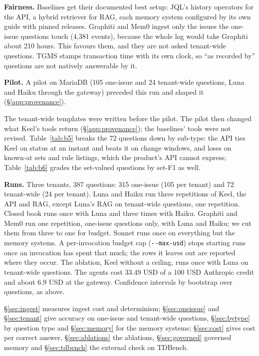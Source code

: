 \documentclass[sigconf, nonacm]{acmart}
\newcommand{\code}[1]{\texttt{#1}}
\begin{document}
\textbf{Fairness.} Baselines get their documented best setup: JQL's history operators for the API, a hybrid retriever for RAG, each memory system configured by its own guide with pinned releases. Graphiti and Mem0 ingest only the issues the one-issue questions touch (4,381 events), because the whole log would take Graphiti about 210 hours. This favours them, and they are not asked tenant-wide questions. TGMS stamps transaction time with its own clock, so ``as recorded by'' questions are not natively answerable by it.

\textbf{Pilot.} A pilot on MariaDB (105 one-issue and 24 tenant-wide questions, Luna and Haiku through the gateway) preceded this run and shaped it (\S\ref{app:provenance}).

The tenant-wide templates were written before the pilot. The pilot then changed what Keel's tools return (\S\ref{app:provenance}); the baselines' tools were not revised. Table~\ref{tab:b5} breaks the 72 questions down by sub-type: the API ties Keel on status at an instant and beats it on change windows, and loses on known-at sets and rule listings, which the product's API cannot express; Table~\ref{tab:b6} grades the set-valued questions by set-F1 as well.

\textbf{Runs.} Three tenants, 387 questions: 315 one-issue (105 per tenant) and 72 tenant-wide (24 per tenant). Luna and Haiku run three repetitions of Keel, the API and RAG, except Luna's RAG on tenant-wide questions, one repetition. Closed book runs once with Luna and three times with Haiku. Graphiti and Mem0 run one repetition, one-issue questions only, with Luna and Haiku; we cut them from three to one for budget. Sonnet runs once on everything but the memory systems. A per-invocation budget cap (\code{-{}-max-usd}) stops starting runs once an invocation has spent that much; the rows it leaves out are reported where they occur. The ablation, Keel without a ceiling, runs once with Luna on tenant-wide questions. The agents cost 33.49 USD of a 100 USD Anthropic credit and about 6.9 USD at the gateway. Confidence intervals by bootstrap over questions, as above.

\S\ref{sec:ingest} measures ingest cost and determinism; \S\ref{sec:oneissue} and \S\ref{sec:tenant} give accuracy on one-issue and tenant-wide questions, \S\ref{sec:bytype} by question type and \S\ref{sec:memory} for the memory systems; \S\ref{sec:cost} gives cost per correct answer, \S\ref{sec:ablations} the ablations, \S\ref{sec:governed} governed memory and \S\ref{sec:tdbench} the external check on TDBench.
\end{document}
